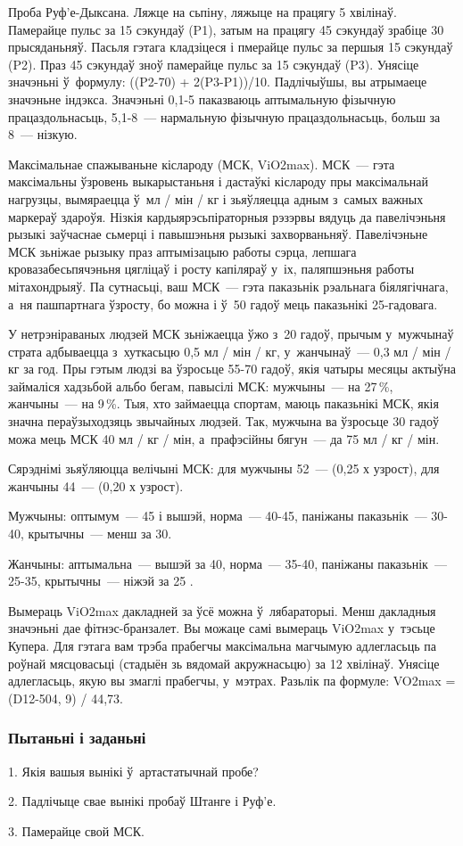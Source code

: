 Проба Руф'е-Дыксана. Ляжце на сьпіну, ляжыце на працягу 5 хвілінаў. Памерайце пульс за 15 сэкундаў (P1), затым на працягу 45 сэкундаў зрабіце 30 прысяданьняў. Пасьля гэтага кладзіцеся і пмерайце пульс за першыя 15 сэкундаў (P2). Праз 45 сэкундаў зноў памерайце пульс за 15 сэкундаў (P3). Унясіце значэньні ў~формулу: ((P2-70) + 2(P3-P1))/10. Падлічыўшы, вы атрымаеце значэньне індэкса. Значэньні 0,1-5 паказваюць аптымальную фізычную працаздольнасьць, 5,1-8~--- нармальную фізычную працаздольнасьць, больш за 8~--- нізкую.

Максімальнае спажываньне кіслароду (МСК, ViO2max). МСК~--- гэта максімальны ўзровень выкарыстаньня і дастаўкі кіслароду пры максімальнай нагрузцы, вымяраецца ў~мл / мін / кг і зьяўляецца адным з~самых важных маркераў здароўя. Нізкія кардыярэсьпіраторныя рэзэрвы вядуць да павелічэньня рызыкі заўчаснае сьмерці і павышэньня рызыкі захворваньняў. Павелічэньне МСК зьніжае рызыку праз аптымізацыю работы сэрца, лепшага кровазабесьпячэньня цягліцаў і росту капіляраў у~іх, паляпшэньня работы мітахондрыяў. Па сутнасьці, ваш МСК~--- гэта паказьнік рэальнага біялягічнага, а~ня пашпартнага ўзросту, бо можна і ў~50 гадоў мець паказьнікі 25-гадовага. 

У нетрэніраваных людзей МСК зьніжаецца ўжо з~20 гадоў, прычым у~мужчынаў страта адбываецца з~хуткасьцю 0,5 мл / мін / кг, у~жанчынаў~--- 0,3 мл / мін / кг за год. Пры гэтым людзі ва ўзросьце 55-70 гадоў, якія чатыры месяцы актыўна займаліся хадзьбой альбо бегам, павысілі МСК: мужчыны~--- на 27\,\%, жанчыны~--- на 9\,\%. Тыя, хто займаецца спортам, маюць паказьнікі МСК, якія значна пераўзыходзяць звычайных людзей. Так, мужчына ва ўзросьце 30 гадоў можа мець МСК 40 мл / кг / мін, а~прафэсійны бягун~--- да 75 мл / кг / мін.

Сярэднімі зьяўляюцца велічыні МСК: для мужчыны 52~--- (0,25 х узрост), для жанчыны 44~--- (0,20 х узрост). 

Мужчыны: оптымум~--- 45 і вышэй, норма~--- 40-45, паніжаны паказьнік~--- 30-40, крытычны~--- менш за 30. 

Жанчыны: аптымальна~--- вышэй за 40, норма~--- 35-40, паніжаны паказьнік~--- 25-35, крытычны~--- ніжэй за 25 .

Вымераць ViO2max дакладней за ўсё можна ў~лябараторыі. Менш дакладныя значэньні дае фітнэс-бранзалет. Вы можаце самі вымераць ViO2max у~тэсьце Купера. Для гэтага вам трэба прабегчы максімальна магчымую адлегласьць па роўнай мясцовасьці (стадыён зь вядомай акружнасьцю) за 12 хвілінаў. Унясіце адлегласьць, якую вы змаглі прабегчы, у~мэтрах. Разьлік па формуле: VO2max = (D12-504, 9) / 44,73.

\subsubsection{Пытаньні і заданьні}

1. Якія вашыя вынікі ў~артастатычнай пробе?

2. Падлічыце свае вынікі пробаў Штанге і Руф'е.

3. Памерайце свой МСК.

